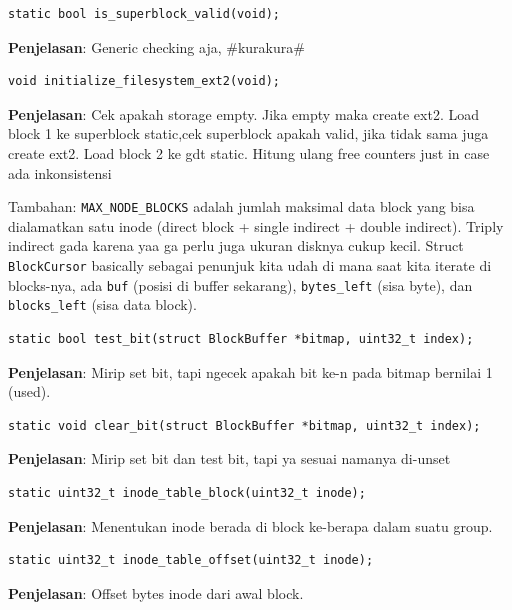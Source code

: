 \begin{lstlisting}
static bool is_superblock_valid(void);
\end{lstlisting}

\textbf{Penjelasan}:
Generic checking aja, \#kurakura\#

\begin{lstlisting}
void initialize_filesystem_ext2(void);
\end{lstlisting}

\textbf{Penjelasan}:
Cek apakah storage empty. Jika empty maka create ext2. Load block 1 ke superblock static,cek superblock apakah valid, jika tidak sama juga create ext2. Load block 2 ke gdt static. Hitung ulang free counters just in case ada inkonsistensi

Tambahan: \texttt{MAX\_NODE\_BLOCKS} adalah jumlah maksimal data block yang bisa dialamatkan satu inode (direct block + single indirect + double indirect). Triply indirect gada karena yaa ga perlu juga ukuran disknya cukup kecil. Struct \texttt{BlockCursor} basically sebagai penunjuk kita udah di mana saat kita iterate di blocks-nya, ada \texttt{buf} (posisi di buffer sekarang), \texttt{bytes\_left} (sisa byte), dan \texttt{blocks\_left} (sisa data block).

\begin{lstlisting}
static bool test_bit(struct BlockBuffer *bitmap, uint32_t index);
\end{lstlisting}

\textbf{Penjelasan}: Mirip set bit, tapi ngecek apakah bit ke-n pada bitmap bernilai 1 (used).

\begin{lstlisting}
static void clear_bit(struct BlockBuffer *bitmap, uint32_t index);
\end{lstlisting}

\textbf{Penjelasan}: Mirip set bit dan test bit, tapi ya sesuai namanya di-unset

\begin{lstlisting}
static uint32_t inode_table_block(uint32_t inode);
\end{lstlisting}

\textbf{Penjelasan}: Menentukan inode berada di block ke-berapa dalam suatu group.

\begin{lstlisting}
static uint32_t inode_table_offset(uint32_t inode);
\end{lstlisting}

\textbf{Penjelasan}: Offset bytes inode dari awal block.

